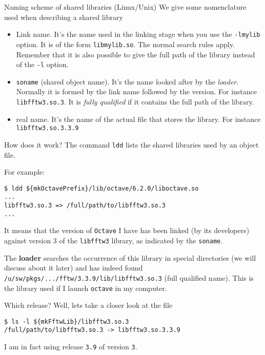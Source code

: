 \documentclass[10pt,aspectratio=169]{beamer}
\begin{document}
\begin{frame}{Naming scheme of shared libraries (Linux/Unix)}
  We give some nomenclature used when describing a shared library

  \begin{itemize}
  \item Link name. It's the name used in the linking stage when
    you use the \texttt{-lmylib} option.  It is of the
    form \texttt{libmylib.so}. The normal search rules
    apply. Remember that it is also possible to give the full path of
    the library instead of the \texttt{-l} option.
  \item \texttt{soname} (shared object name).  It's the name looked after
    by the \emph{loader}.  Normally it is formed by the link name
    followed by the version.  For instance
    \texttt{libfftw3.so.3}. It is \emph{fully
    qualified} if it contains the full path of the library.
  \item real name. It's the name of the actual file that stores the library. 
    For instance \texttt{libfftw3.so.3.3.9}
  \end{itemize}
\end{frame}


\begin{frame}[fragile]{How does it work?}  The command
  \texttt{ldd} lists the shared libraries used by an object file.

  For example:
\begin{verbatim}
$ ldd ${mkOctavePrefix}/lib/octave/6.2.0/liboctave.so
...
libfftw3.so.3 => /full/path/to/libfftw3.so.3
...
\end{verbatim}
It means that the version of \texttt{Octave} I have has been linked (by its
developers) against version $3$ of the \texttt{libfftw3} library, 
as indicated by the \texttt{soname}.

The \textbf{loader} searches the occurrence of this library in special
directories (we will discuss about it later) and has indeed found
\texttt{/u/sw/pkgs/.../fftw/3.3.9/lib/libfftw3.so.3} (full qualified name). This is the library used if I launch \texttt{octave} in my computer. \smallskip

Which release? Well, lets take a closer look at the file
\begin{verbatim}
$ ls -l ${mkFftwLib}/libfftw3.so.3
/full/path/to/libfftw3.so.3 -> libfftw3.so.3.3.9
\end{verbatim}
I am in fact using release \texttt{3.9} of version \texttt{3}.
\end{frame}
\end{document}
